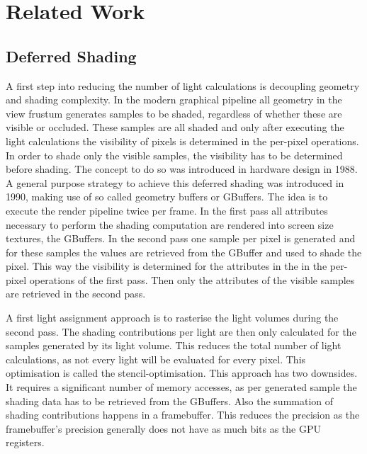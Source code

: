 \section{Related Work}

\subsection{Deferred Shading}

A first step into reducing the number of light calculations is decoupling
geometry and shading complexity. In the modern graphical pipeline all geometry
in the view frustum generates samples to be shaded, regardless of whether these
are visible or occluded. These samples are all shaded and only after executing
the light calculations the visibility of pixels is determined in the per-pixel
operations. In order to shade only the visible samples, the visibility has to be
determined before shading. The concept to do so was introduced in hardware
design in 1988\cite{deering1988triangle}. A general purpose strategy to achieve
this deferred shading was introduced in 1990, making use of so called
geometry buffers or GBuffers\cite{saito1990comprehensible}. The idea
is to execute the render pipeline twice per frame. In the first pass all
attributes necessary to perform the shading computation are rendered into screen
size textures, the GBuffers. In the second pass one sample per pixel is generated and
for these samples the values are retrieved from the GBuffer and used to shade
the pixel. This way the visibility is determined for the attributes in the in
the per-pixel operations of the first pass. Then only the attributes of the
visible samples are retrieved in the second pass.

A first light assignment approach is to rasterise the light volumes during the
second pass. The shading contributions per light are then only calculated for
the samples generated by its light volume. This reduces the total number
of light calculations, as not every light will be evaluated for every pixel.
This optimisation is called the stencil-optimisation\cite{doi:10.1080/10867651.2003.10487587}.
This approach has two downsides. It requires a significant number of memory
accesses, as per generated sample the shading data has to be retrieved from the
GBuffers. Also the summation of shading contributions happens in a framebuffer.
This reduces the precision as the framebuffer's precision generally does not
have as much bits as the GPU registers.

